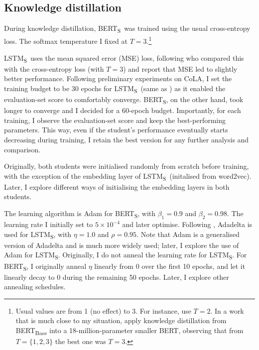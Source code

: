\documentclass[bsc,frontabs,twoside,singlespacing,parskip,deptreport]{infthesis}
\def\BERTS{BERT\textsubscript{S}}
\def\LSTMS{LSTM\textsubscript{S}}
\begin{document}
{{    %
    \subsection{Knowledge distillation}{
      During knowledge distillation, \BERTS~was trained using the usual cross-entropy loss. The softmax temperature I fixed at $T=3$.\footnote{Usual values are from 1 (no effect) to 3. For instance, \citet{Sanh_2019} use $T=2$. In a work that is much close to my situation, \citet{Tsai_2019} apply knowledge distillation from BERT\textsubscript{Base} into a 18-million-parameter smaller BERT, observing that from $T=\{1, 2, 3\}$ the best one was $T=3$.}
      
      \LSTMS~uses the mean squared error (MSE) loss, following \citeauthor{Tang_2019b} who compared this with the cross-entropy loss (with $T=3$) and report that MSE led to slightly better performance. Following preliminary experiments on CoLA, I set the training budget to be 30 epochs for \LSTMS~(same as \citeauthor{Tang_2019b}) as it enabled the evaluation-set score to comfortably converge. \BERTS, on the other hand, took longer to converge and I decided for a 60-epoch budget. Importantly, for each training, I observe the evaluation-set score and keep the best-performing parameters. This way, even if the student's performance eventually starts decreasing during training, I retain the best version for any further analysis and comparison.

      Originally, both students were initialised randomly from scratch before training, with the exception of the embedding layer of \LSTMS~(initalised from word2vec). Later, I explore different ways of initialising the embedding layers in both students.

      The learning algorithm is Adam for \BERTS, with $\beta_1=0.9$ and $\beta_2=0.98$. The learning rate I initially set to $5\times10^{-4}$ and later optimise.
      Following \citeauthor{Tang_2019b}, Adadelta \citep{Zeiler_2012} is used for \LSTMS, with $\eta=1.0$ and $\rho=0.95$.
      Note that Adam is a generalised version of Adadelta and is much more widely used; later, I explore the use of Adam for \LSTMS. Originally, I do not anneal the learning rate for \LSTMS. For \BERTS, I originally anneal $\eta$ linearly from 0 over the first 10 epochs, and let it linearly decay to 0 during the remaining 50 epochs. Later, I explore other annealing schedules.

}}}
\end{document}
